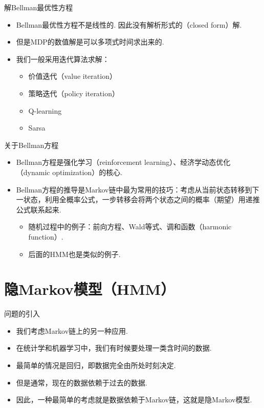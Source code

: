 \begin{frame}{解Bellman最优性方程}
    \begin{itemize}
        \item Bellman最优性方程不是线性的. 因此没有解析形式的（closed form）解.
        \item 但是MDP的数值解是可以多项式时间求出来的.
        \item 我们一般采用迭代算法求解：
        \begin{itemize}
            \item 价值迭代（value iteration）
            \item 策略迭代（policy iteration）
            \item Q-learning
            \item Sarsa
        \end{itemize}
    \end{itemize}
\end{frame}
\begin{frame}{关于Bellman方程}
\begin{itemize}
    \item Bellman方程是强化学习（reinforcement learning）、经济学动态优化（dynamic optimization）的核心.
    \item Bellman方程的推导是Markov链中最为常用的技巧：考虑从当前状态转移到下一状态，利用全概率公式，一步转移会将两个状态之间的概率（期望）用递推公式联系起来.
    \begin{itemize}
        \item 随机过程中的例子：前向方程、Wald等式、调和函数（harmonic function）.
        \item 后面的HMM也是类似的例子.
    \end{itemize}
\end{itemize}
\end{frame}

\section{隐Markov模型（HMM）}
\begin{frame}{问题的引入}
\begin{itemize}
    \item 我们考虑Markov链上的另一种应用.
    \item 在统计学和机器学习中，我们有时候要处理一类含时间的数据.
    \item 最简单的情况是回归，即数据完全由所处时刻决定.
    \item 但是通常，现在的数据依赖于过去的数据.
    \item 因此，一种最简单的考虑就是数据依赖于Markov链，这就是隐Markov模型.
\end{itemize}
\end{frame}

